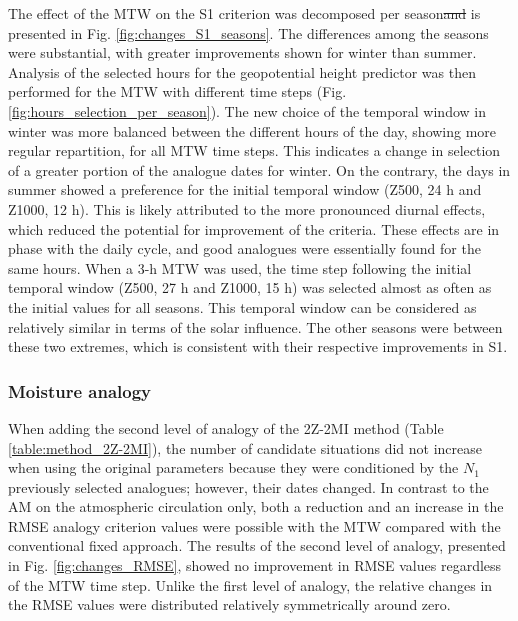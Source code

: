 \documentclass[hess, manuscript]{copernicus}
\providecommand{\DIFadd}[1]{{\protect\color{blue}\uwave{#1}}} %
\providecommand{\DIFdel}[1]{{\protect\color{red}\sout{#1}}}                      %
\providecommand{\DIFaddbegin}{} %
\providecommand{\DIFaddend}{} %
\providecommand{\DIFdelbegin}{} %
\providecommand{\DIFdelend}{} %
\begin{document}
	The effect of the MTW on the S1 criterion was decomposed per season\DIFdelbegin \DIFdel{and }\DIFdelend \DIFaddbegin \DIFadd{, which }\DIFaddend is presented in Fig. \ref{fig:changes_S1_seasons}. The differences among the seasons were substantial, with greater improvements shown for winter than summer. Analysis of the selected hours for the geopotential height predictor was then performed for the MTW with different time steps (Fig. \ref{fig:hours_selection_per_season}). The new choice of the temporal window in winter was more balanced between the different hours of the day, showing more regular repartition, for all MTW time steps. This indicates a change in selection of a greater portion of the analogue dates for winter. On the contrary, the days in summer showed a preference for the initial temporal window (Z500, 24 h and Z1000, 12 h). This is likely attributed to the more pronounced diurnal effects, which reduced the potential for improvement of the criteria. These effects are in phase with the daily cycle, and good analogues were essentially found for the same hours. When a 3-h MTW was used, the time step following the initial temporal window (Z500, 27 h and Z1000, 15 h) was selected almost as often as the initial values for all seasons. This temporal window can be considered as relatively similar in terms of the solar influence. The other seasons were between these two extremes, which is consistent with their respective improvements in S1.

	
	\subsubsection{Moisture analogy}
	\label{sec:changes_analogy_moisture}

	When adding the second level of analogy \DIFaddbegin \DIFadd{on moisture variables }\DIFaddend of the 2Z-2MI method (Table \ref{table:method_2Z-2MI}), the number of candidate situations \DIFaddbegin \DIFadd{for this level }\DIFaddend did not increase when using the original parameters because they were conditioned by the $N_{1}$ previously selected analogues; however, their dates changed. In contrast to the AM on the atmospheric circulation only, both a reduction and an increase in the RMSE analogy criterion values were possible with the MTW compared with the conventional fixed approach. The results of the second level of analogy, presented in Fig. \ref{fig:changes_RMSE}, showed no improvement in RMSE values regardless of the MTW time step. Unlike the first level of analogy, the relative changes in the RMSE values were distributed relatively symmetrically around zero.
\end{document}

